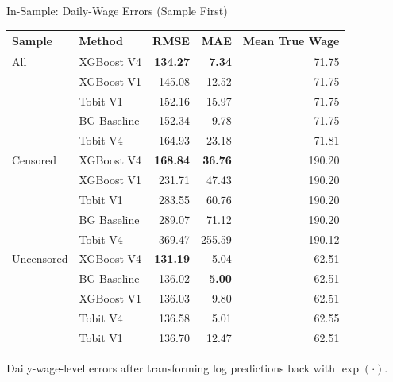 \documentclass[10pt]{beamer}
\newcommand{\best}[1]{\cellcolor{yellow!40}\textbf{#1}}
\begin{document}
\begin{frame}{In-Sample: Daily-Wage Errors (Sample First)}
\centering
\fontsize{5.5}{6.6}\selectfont
\begin{tabular}{llrrr}
\toprule
Sample & Method & RMSE & MAE & Mean True Wage \\
\midrule
All & XGBoost V4 & \best{134.27} & \best{7.34} & 71.75 \\
 & XGBoost V1 & 145.08 & 12.52 & 71.75 \\
 & Tobit V1 & 152.16 & 15.97 & 71.75 \\
 & BG Baseline & 152.34 & 9.78 & 71.75 \\
 & Tobit V4 & 164.93 & 23.18 & 71.81 \\
\midrule
Censored & XGBoost V4 & \best{168.84} & \best{36.76} & 190.20 \\
 & XGBoost V1 & 231.71 & 47.43 & 190.20 \\
 & Tobit V1 & 283.55 & 60.76 & 190.20 \\
 & BG Baseline & 289.07 & 71.12 & 190.20 \\
 & Tobit V4 & 369.47 & 255.59 & 190.12 \\
\midrule
Uncensored & XGBoost V4 & \best{131.19} & 5.04 & 62.51 \\
 & BG Baseline & 136.02 & \best{5.00} & 62.51 \\
 & XGBoost V1 & 136.03 & 9.80 & 62.51 \\
 & Tobit V4 & 136.58 & 5.01 & 62.55 \\
 & Tobit V1 & 136.70 & 12.47 & 62.51 \\
\bottomrule
\end{tabular}

\vspace{0.25cm}
\small
Daily-wage-level errors after transforming log predictions back with $\exp(\cdot)$.
\end{frame}
\end{document}

